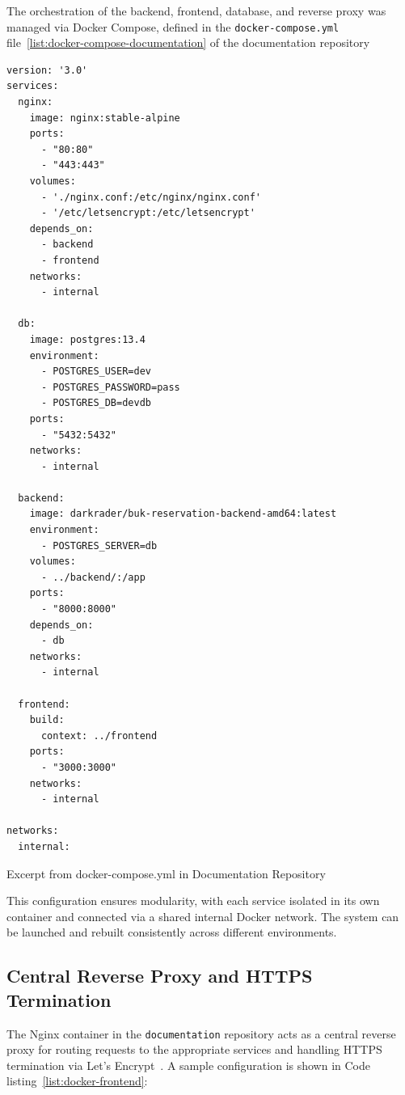 The orchestration of the backend, frontend, database, and reverse proxy was managed via Docker Compose, defined in the \texttt{docker-compose.yml} file~\ref{list:docker-compose-documentation} of the documentation repository

\begin{listing}
  \begin{verbatim}
version: '3.0'
services:
  nginx:
    image: nginx:stable-alpine
    ports:
      - "80:80"
      - "443:443"
    volumes:
      - './nginx.conf:/etc/nginx/nginx.conf'
      - '/etc/letsencrypt:/etc/letsencrypt'
    depends_on:
      - backend
      - frontend
    networks:
      - internal

  db:
    image: postgres:13.4
    environment:
      - POSTGRES_USER=dev
      - POSTGRES_PASSWORD=pass
      - POSTGRES_DB=devdb
    ports:
      - "5432:5432"
    networks:
      - internal

  backend:
    image: darkrader/buk-reservation-backend-amd64:latest
    environment:
      - POSTGRES_SERVER=db
    volumes:
      - ../backend/:/app
    ports:
      - "8000:8000"
    depends_on:
      - db
    networks:
      - internal

  frontend:
    build:
      context: ../frontend
    ports:
      - "3000:3000"
    networks:
      - internal

networks:
  internal:
\end{verbatim}
\caption{Excerpt from docker-compose.yml in Documentation Repository}
\label{list:docker-compose-documentation}
\end{listing}

This configuration ensures modularity, with each service isolated in its own container and connected via a shared internal Docker network. The system can be launched and rebuilt consistently across different environments.

\subsection{Central Reverse Proxy and HTTPS Termination}

The Nginx container in the \texttt{documentation} repository acts as a central reverse proxy for routing requests to the appropriate services and handling HTTPS termination via Let's Encrypt~\cite{LetsEncrypt}. A sample configuration is shown in Code listing~\ref{list:docker-frontend}:

